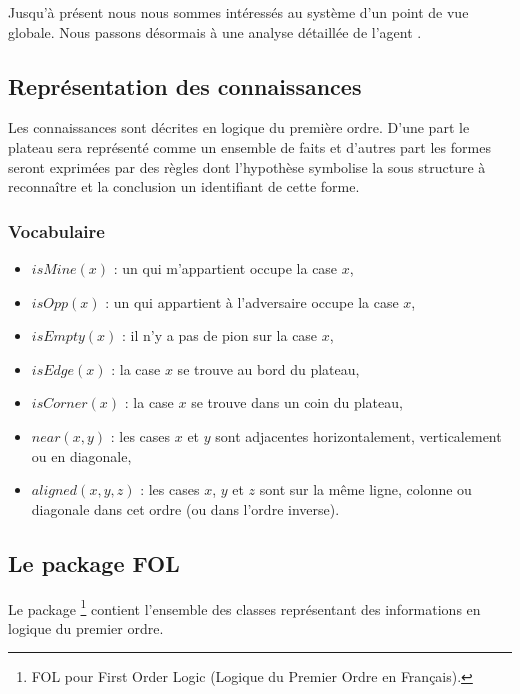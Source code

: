 Jusqu'à présent nous nous sommes intéressés au système d'un point de vue globale. Nous passons désormais à une analyse détaillée de l'agent \cogito{}.

\subsection{Représentation des connaissances}
\label{subsection_representation_co}
	Les connaissances sont décrites en logique du première ordre. D'une part le plateau sera représenté comme un ensemble de faits et d'autres part les \og formes \fg{} seront exprimées par des règles dont l'hypothèse symbolise la sous structure à reconnaître et la conclusion un identifiant de cette forme.
	
	\subsubsection{Vocabulaire} 
	\begin{itemize}
	\item $isMine(x)$ : un qui m'appartient occupe la case $x$,
  	\item $isOpp(x)$ : un qui appartient à l'adversaire occupe la case $x$,
  	\item $isEmpty(x)$ : il n'y a pas de pion sur la case $x$,
  	\item $isEdge(x)$ : la case $x$ se trouve au bord du plateau,
  	\item $isCorner(x)$ : la case $x$ se trouve dans un coin du plateau,
  	\item $near(x,y)$ : les cases $x$ et $y$ sont adjacentes horizontalement, verticalement ou en diagonale,
  	\item $aligned(x,y,z)$ : les cases $x$, $y$ et $z$ sont sur la même ligne, colonne ou diagonale dans cet ordre (ou dans l'ordre inverse).
	\end{itemize}

\label{specs_voc_fol}

\subsection{Le package FOL}
\label{subsection_fol}

Le package \footnote{FOL pour \og First Order Logic \fg{} (\og Logique du Premier Ordre \fg{} en Français). } contient l'ensemble des classes représentant des informations en logique du premier ordre.

